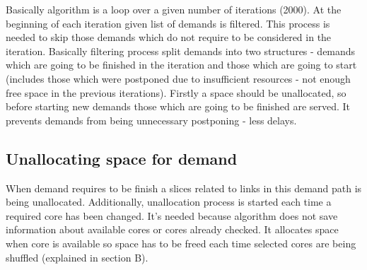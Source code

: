 \documentclass[conference]{IEEEtran}
\begin{document}
Basically algorithm is a loop over a given number of iterations (2000). At the beginning of each iteration given list of demands is filtered. This process is needed to skip those demands which do not require to be considered in the iteration. Basically filtering process split demands into two structures - demands which are going to be finished in the iteration and those which are going to start (includes those which were postponed due to insufficient resources - not enough free space in the previous iterations). Firstly a space should be unallocated, so before starting new demands those which are going to be finished are served. It prevents demands from being unnecessary postponing - less delays.
\subsection{Unallocating space for demand}
When demand requires to be finish a slices related to links in this demand path is being unallocated.
Additionally, unallocation process is started each time a required core has been changed. It's needed because algorithm does not save information about available cores or cores already checked. It allocates space when core is available so space has to be freed each time selected cores are being shuffled (explained in section B).
\end{document}
